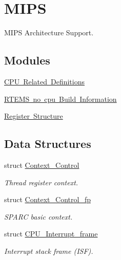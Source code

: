 \hypertarget{group__RTEMSScoreCPUMIPS}{}\section{M\+I\+PS}
\label{group__RTEMSScoreCPUMIPS}


M\+I\+PS Architecture Support.  


\subsection*{Modules}
\begin{DoxyCompactItemize}
\item 
\mbox{\hyperlink{group__RTEMSScoreMIPSSet__idtcpu}{C\+P\+U Related Definitions}}
\item 
\mbox{\hyperlink{group__RTEMSScoreCPUMIPSBuild}{R\+T\+E\+M\+S no cpu Build Information}}
\item 
\mbox{\hyperlink{group__RTEMSScoreMIPSSet__iregdef}{Register Structure}}
\end{DoxyCompactItemize}
\subsection*{Data Structures}
\begin{DoxyCompactItemize}
\item 
struct \mbox{\hyperlink{structContext__Control}{Context\+\_\+\+Control}}
\begin{DoxyCompactList}\small\item\em Thread register context. \end{DoxyCompactList}\item 
struct \mbox{\hyperlink{structContext__Control__fp}{Context\+\_\+\+Control\+\_\+fp}}
\begin{DoxyCompactList}\small\item\em S\+P\+A\+RC basic context. \end{DoxyCompactList}\item 
struct \mbox{\hyperlink{structCPU__Interrupt__frame}{C\+P\+U\+\_\+\+Interrupt\+\_\+frame}}
\begin{DoxyCompactList}\small\item\em Interrupt stack frame (I\+SF). \end{DoxyCompactList}\end{DoxyCompactItemize}
